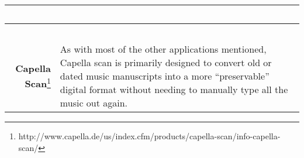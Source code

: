 \begin{table}[h]
\begin{tabularx}{\linewidth}{ r | X }
    \ & \ \\
    \hline
    \ & \ \\

    \textbf{Capella Scan}\footnote{http://www.capella.de/us/index.cfm/products/capella-scan/info-capella-scan/} & As with most of the other applications mentioned, Capella scan is primarily designed to convert old or dated music manuscripts into a more ``preservable'' digital format without needing to manually type all the music out again. \\

\end{tabularx}
\end{table}
